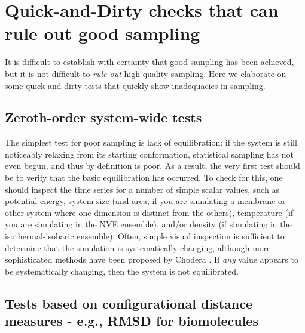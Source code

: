 
\section{Quick-and-Dirty checks that can rule out good sampling}
\label{sec:quick}

It is difficult to establish with certainty that good sampling has been achieved, but it is not difficult to \emph{rule out} high-quality sampling.
Here we elaborate on some quick-and-dirty tests that quickly show inadequacies in sampling.

\subsection{Zeroth-order system-wide tests}

The simplest test for poor sampling is lack of equilibration: if the system is still noticeably relaxing from its starting conformation, statistical sampling has not even begun, and thus by definition is poor.  As a result, the very first test should be to verify that the basic equilibration has occurred.  To check for this, one should inspect the time series for a number of simple scalar values, such as potential energy, system size (and area, if you are simulating a membrane or other system where one dimension is distinct from the others), temperature (if you are simulating in the NVE ensemble), and/or density (if simulating in the isothermal-isobaric ensemble).  Often, simple visual inspection is sufficient to determine that the simulation is systematically changing, although more sophisticated methods have been proposed by Chodera \cite{Chodera-2016}.  If \emph{any} value appears to be systematically changing, then the system is not equilibrated.

\subsection{Tests based on configurational distance measures - e.g., RMSD for biomolecules}

